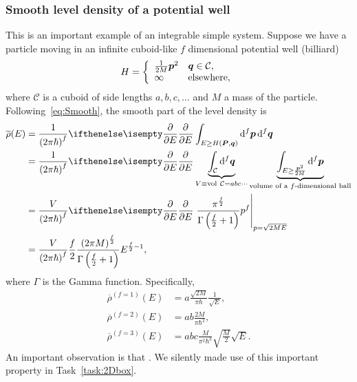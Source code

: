 \documentclass[a4paper,11pt,twoside]{article}
\begin{document}
        \subsubsection{Smooth level density of a potential well}
            This is an important example of an integrable simple system.
            Suppose we have a particle moving in an infinite cuboid-like $f$ dimensional potential well (billiard)
            \begin{equation}
                H=\left\{\begin{array}{ll}
                    \frac{1}{2M}\boldsymbol{p}^{2} & \boldsymbol{q}\in\mathcal{C},\\
                    \infty & \text{elsewhere},
                \end{array}
                \right.
            \end{equation}
            where $\mathcal{C}$ is a cuboid of side lengths $a,b,c,\dotsc$ and $M$ a mass of the particle.
            Following~\eqref{eq:Smooth}, the smooth part of the level density is 
            \begin{align}
                \overline{\rho}(E)
                    &=\frac{1}{\left(2\pi\hbar\right)^{f}}\partialderivative{}{E}
                        \int_{E\geq H(\vector{P},\vector{q})}\d^{f}\vector{p}\,\d^{f}\vector{q}\nonumber\\
                    &=\frac{1}{\left(2\pi\hbar\right)^{f}}\partialderivative{}{E}
                        \underbrace{\int_{\mathcal{C}}\d^{f}\vector{q}}_{V\equiv\mathrm{vol}\ \mathcal{C}=abc\dotsb}
                        \underbrace{\int_{E\geq \frac{\vector{p}^{2}}{2M}}\d^{f}\vector{p}}_{\text{volume of a $f$-dimensional ball}}\nonumber\\
                    &=\frac{V}{\left(2\pi\hbar\right)^{f}}\partialderivative{}{E}
                        \left.\frac{\pi^{\frac{f}{2}}}{\Gamma\left(\frac{f}{2}+1\right)}p^{f}\right|_{p=\sqrt{2ME}}\nonumber\\
                    \label{eq:rhoWell}
                    &=\frac{V}{\left(2\pi\hbar\right)^{f}}\frac{f}{2}\frac{\left(2\pi M\right)^{\frac{f}{2}}}{\Gamma\left(\frac{f}{2}+1\right)}E^{\frac{f}{2}-1},
            \end{align} 
            where $\Gamma$ is the Gamma function.
            Specifically,
            \begin{align}
                \overline{\rho}^{(f=1)}(E)
                    &=a\frac{\sqrt{2M}}{\pi\hbar}\frac{1}{\sqrt{E}},\\
                \overline{\rho}^{(f=2)}(E)
                    &=ab\frac{2M}{\pi\hbar^{2}},\\
                \overline{\rho}^{(f=3)}(E)   
                    &=abc\frac{M}{\pi^{2}\hbar^{3}}\sqrt{\frac{M}{2}}\sqrt{E}.
            \end{align}
            An important observation is that .
            We silently made use of this important property in Task~\ref{task:2Dbox}.
\end{document}
